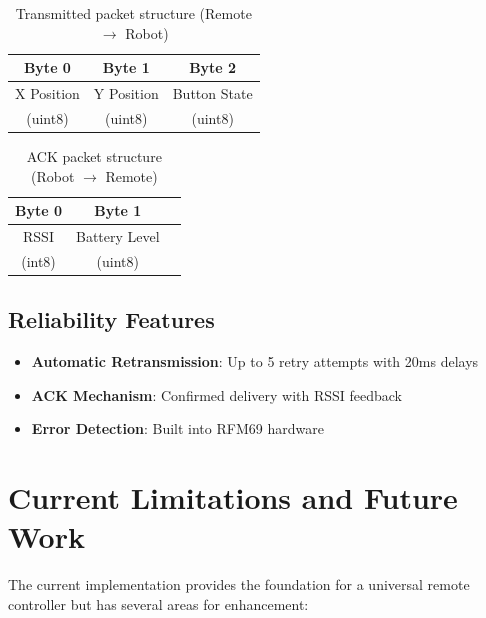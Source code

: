 \begin{table}[H]
    \centering
    \caption{Transmitted packet structure (Remote $\rightarrow$ Robot)}
    \label{tab:packet_tx}
    \begin{tabular}{|c|c|c|}
        \hline
        \textbf{Byte 0} & \textbf{Byte 1} & \textbf{Byte 2} \\
        \hline
        X Position & Y Position & Button State \\
        (uint8) & (uint8) & (uint8) \\
        \hline
    \end{tabular}
\end{table}

\begin{table}[H]
    \centering
    \caption{ACK packet structure (Robot $\rightarrow$ Remote)}
    \label{tab:packet_ack}
    \begin{tabular}{|c|c|c|}
        \hline
        \textbf{Byte 0} & \textbf{Byte 1} \\
        \hline
        RSSI & Battery Level \\
        (int8) & (uint8) \\
        \hline
    \end{tabular}
\end{table}

\subsection{Reliability Features}

\begin{itemize}
    \item \textbf{Automatic Retransmission}: Up to 5 retry attempts with 20ms delays
    \item \textbf{ACK Mechanism}: Confirmed delivery with RSSI feedback
    \item \textbf{Error Detection}: Built into RFM69 hardware
\end{itemize}

\section{Current Limitations and Future Work}

The current implementation provides the foundation for a universal remote controller but has several areas for enhancement:

